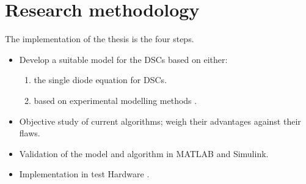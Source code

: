 \section{Research methodology}
The implementation of the thesis is the four steps. 
\begin{itemize}
\item Develop a suitable model for the \ac{DSCs} based on either:
	\begin{enumerate}
		\item the single diode equation for \ac{DSCs}.
		\item based on experimental modelling methods .
	\end{enumerate}
\item Objective study of current algorithms;  weigh their advantages against their flaws.
\item Validation of the model and algorithm in MATLAB{\textregistered} and Simulink{\textregistered}.
\item Implementation in test Hardware .
\end {itemize}